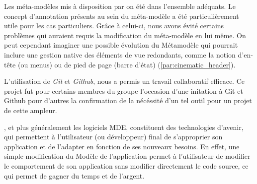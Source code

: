 Les méta-modèles mis à disposition par \kwobeo{} on été dans l'ensemble adéquats. Le concept d'annotation présents au sein du méta-modèle \kwentity{} a été particulièrement utile pour les cas particuliers. Grâce à celui-ci, nous avons évité certains problèmes qui auraient requis la modification du méta-modèle en lui même. On peut cependant imaginer une possible évolution du Métamodèle \kwcinematic qui pourrait inclure une gestion native des éléments de vue redondants, comme la notion d'en-tête (ou menus) ou de pied de page (barre d'état) (\ref{par:cinematic_header}).

L'utilisation de \textit{Git} et \textit{Github}, nous a permis un travail collaboratif efficace. Ce projet fut pour certains membres du groupe l'occasion d'une initation à Git et Github pour d'autres la confirmation de la nécéssité d'un tel outil pour un projet de cette ampleur.

\kwacceleo{}, et plus généralement les logiciels MDE, constituent des technologies d'avenir, qui permettent à l'utilisateur (ou développeur) final de s'approprier son application et de l'adapter en fonction de ses nouveaux besoins. En effet, une simple modification du Modèle de l'application permet à l'utilisateur de modifier le comportement de son application sans modifier directement le code source, ce qui permet de gagner du temps et de l'argent.



